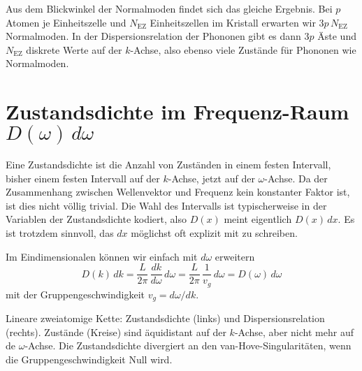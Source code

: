 Aus dem Blickwinkel der Normalmoden findet sich das gleiche Ergebnis. Bei $p$ Atomen je Einheitszelle und $N_\text{EZ}$ Einheitszellen im Kristall erwarten wir $3 p \, N_\text{EZ}$ Normalmoden. In der Dispersionsrelation der Phononen gibt es dann $3p$ Äste und $N_\text{EZ}$ diskrete Werte auf der $k$-Achse, also ebenso viele Zustände für Phononen wie Normalmoden.




\section{Zustandsdichte im Frequenz-Raum $D(\omega) \, d\omega$ }

Eine Zustandsdichte ist die Anzahl von Zuständen in einem festen Intervall, bisher einem festen Intervall auf der $k$-Achse, jetzt auf der $\omega$-Achse. Da der Zusammenhang zwischen Wellenvektor und Frequenz kein konstanter Faktor ist, ist dies nicht völlig trivial. Die Wahl des Intervalls ist typischerweise in der Variablen der Zustandsdichte kodiert, also $D(x)$ meint eigentlich $D(x) \, dx$. Es ist trotzdem sinnvoll, das $dx$ möglichst oft explizit mit zu schreiben.

Im Eindimensionalen können wir einfach mit $d \omega$ erweitern
\begin{equation}
D(k) \, dk  =  \frac{L}{2 \pi}\, \frac{dk}{d\omega} \, d\omega 
= \frac{L}{2 \pi}\, \frac{1}{v_g} \, d\omega
= D(\omega) \, d\omega
\end{equation}
mit der Gruppengeschwindigkeit $v_g = d\omega / dk$.

\begin{marginfigure}

\caption{Lineare zweiatomige Kette:  Zustandsdichte (links) und Dispersionsrelation (rechts). Zustände (Kreise) sind äquidistant auf der $k$-Achse, aber nicht mehr auf de $\omega$-Achse. Die Zustandsdichte divergiert an den van-Hove-Singularitäten, wenn die Gruppengeschwindigkeit Null wird.}
\end{marginfigure}


